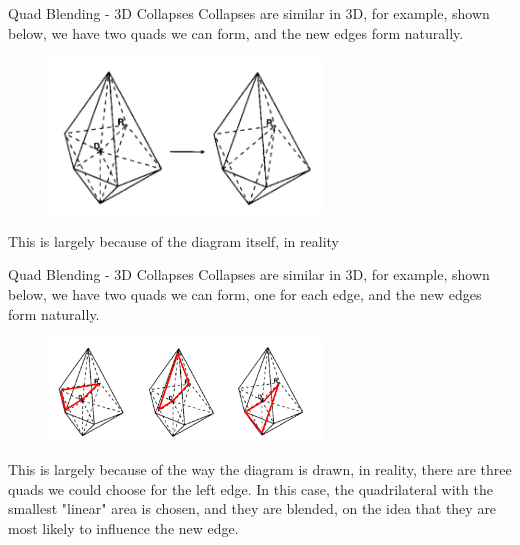 \documentclass[12pt]{beamer}
\begin{document}
\begin{frame}{Quad Blending - 3D Collapses}
Collapses are similar in 3D, for example, shown below, we have two quads we can form, and the new edges form naturally.
\begin{figure}
  \centering
  \includegraphics[width=0.65\textwidth]{bezier_images/edgeCollapse.png} 
\end{figure}
This is largely because of the diagram itself, in reality
\end{frame}
\begin{frame}{Quad Blending - 3D Collapses}
Collapses are similar in 3D, for example, shown below, we have two quads we can form, one for each edge, and the new edges form naturally.
\begin{figure}
  \centering
  \includegraphics[width=0.65\textwidth]{bezier_images/edgeCollapse3.png} 
\end{figure}
This is largely because of the way the diagram is drawn, in reality, there are three quads we could choose for the left edge. In this case, the quadrilateral with the smallest "linear" area is chosen, and they are blended, on the idea that they are most likely to influence the new edge.
\end{frame}
\end{document}

